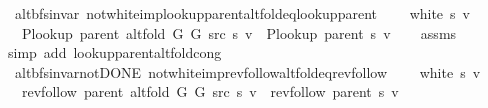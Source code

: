 \begin{isabellebody}
\endisatagproof
{\isafoldproof}%
%
\isadelimproof
\isanewline
%
\endisadelimproof
\isanewline
{}\isamarkupfalse%
\ {\isacharparenleft}{\kern0pt}\ alt{\isacharunderscore}{\kern0pt}bfs{\isacharunderscore}{\kern0pt}invar{\isacharparenright}{\kern0pt}\ not{\isacharunderscore}{\kern0pt}white{\isacharunderscore}{\kern0pt}imp{\isacharunderscore}{\kern0pt}lookup{\isacharunderscore}{\kern0pt}parent{\isacharunderscore}{\kern0pt}alt{\isacharunderscore}{\kern0pt}fold{\isacharunderscore}{\kern0pt}eq{\isacharunderscore}{\kern0pt}lookup{\isacharunderscore}{\kern0pt}parent{\isacharcolon}{\kern0pt}\isanewline
\ \ \ {\isachardoublequoteopen}{\isasymnot}\ white\ s\ v{\isachardoublequoteclose}\isanewline
\ \ \ {\isachardoublequoteopen}P{\isacharunderscore}{\kern0pt}lookup\ {\isacharparenleft}{\kern0pt}parent\ {\isacharparenleft}{\kern0pt}alt{\isacharunderscore}{\kern0pt}fold\ G{}\ G{}\ src\ s{\isacharparenright}{\kern0pt}{\isacharparenright}{\kern0pt}\ v\ {\isacharequal}{\kern0pt}\ P{\isacharunderscore}{\kern0pt}lookup\ {\isacharparenleft}{\kern0pt}parent\ s{\isacharparenright}{\kern0pt}\ v{\isachardoublequoteclose}\isanewline
%
\isadelimproof
\ \ %
\endisadelimproof
%
\isatagproof
{}\isamarkupfalse%
\ assms\isanewline
\ \ \isamarkupfalse%
\ {\isacharparenleft}{\kern0pt}simp\ add{\isacharcolon}{\kern0pt}\ lookup{\isacharunderscore}{\kern0pt}parent{\isacharunderscore}{\kern0pt}alt{\isacharunderscore}{\kern0pt}fold{\isacharunderscore}{\kern0pt}cong{\isacharparenright}{\kern0pt}%
\endisatagproof
{\isafoldproof}%
%
\isadelimproof
\isanewline
%
\endisadelimproof
\isanewline
{}\isamarkupfalse%
\ {\isacharparenleft}{\kern0pt}\ alt{\isacharunderscore}{\kern0pt}bfs{\isacharunderscore}{\kern0pt}invar{\isacharunderscore}{\kern0pt}not{\isacharunderscore}{\kern0pt}DONE{\isacharparenright}{\kern0pt}\ not{\isacharunderscore}{\kern0pt}white{\isacharunderscore}{\kern0pt}imp{\isacharunderscore}{\kern0pt}rev{\isacharunderscore}{\kern0pt}follow{\isacharunderscore}{\kern0pt}alt{\isacharunderscore}{\kern0pt}fold{\isacharunderscore}{\kern0pt}eq{\isacharunderscore}{\kern0pt}rev{\isacharunderscore}{\kern0pt}follow{\isacharcolon}{\kern0pt}\isanewline
\ \ \ {\isachardoublequoteopen}{\isasymnot}\ white\ s\ v{\isachardoublequoteclose}\isanewline
\ \ \ {\isachardoublequoteopen}rev{\isacharunderscore}{\kern0pt}follow\ {\isacharparenleft}{\kern0pt}parent\ {\isacharparenleft}{\kern0pt}alt{\isacharunderscore}{\kern0pt}fold\ G{}\ G{}\ src\ s{\isacharparenright}{\kern0pt}{\isacharparenright}{\kern0pt}\ v\ {\isacharequal}{\kern0pt}\ rev{\isacharunderscore}{\kern0pt}follow\ {\isacharparenleft}{\kern0pt}parent\ s{\isacharparenright}{\kern0pt}\ v{\isachardoublequoteclose}\isanewline

\end{isabellebody}
